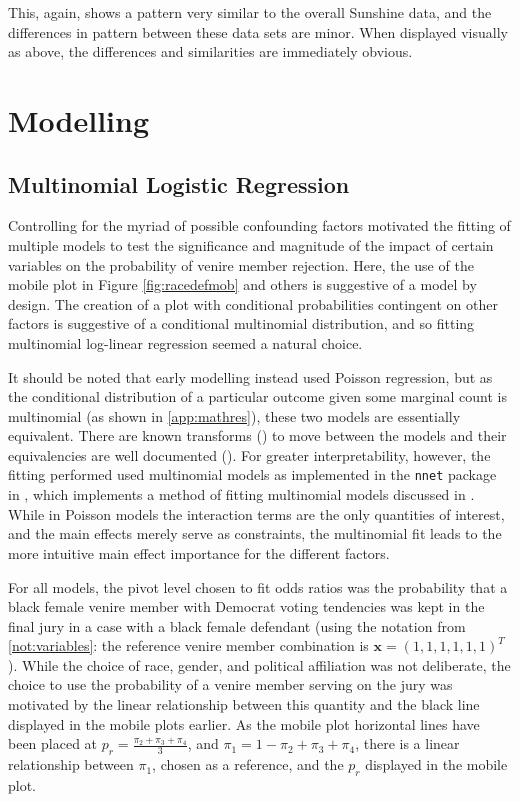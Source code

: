This, again, shows a pattern very similar to the overall Sunshine data, and the differences in pattern between these data sets are
minor. When displayed visually as above, the differences and similarities are immediately obvious.

\section{Modelling} \label{sec:mods}

\subsection{Multinomial Logistic Regression}

Controlling for the myriad of possible confounding factors motivated the fitting of multiple models to test the significance and
magnitude of the impact of certain variables on the probability of venire member rejection. Here, the use of the mobile plot in
Figure \ref{fig:racedefmob} and others is suggestive of a model by design. The creation of a plot with conditional probabilities
contingent on other factors is suggestive of a conditional multinomial distribution, and so fitting multinomial log-linear
regression seemed a natural choice.

It should be noted that early modelling instead used Poisson regression, but as the conditional distribution of a particular
outcome given some marginal count is multinomial (as shown in \ref{app:mathres}), these two models are essentially
equivalent. There are known transforms (\cite{baker1994}) to move between the models and their equivalencies are well documented
(\cite{lang1996}). For greater interpretability, however, the fitting performed used multinomial models as implemented in the
\texttt{nnet} package in \Rp, which implements a method of fitting multinomial models discussed in \cite{nnet}. While in Poisson
models the interaction terms are the only quantities of interest, and the main effects merely serve as constraints, the
multinomial fit leads to the more intuitive main effect importance for the different factors.

For all models, the pivot level chosen to fit odds ratios was the probability that a black female venire member with Democrat
voting tendencies was kept in the final jury in a case with a black female defendant (using the notation from \ref{not:variables}:
the reference venire member combination is $\mathbf{x} = (1,1,1,1,1,1)^T$). While the choice of race, gender, and political
affiliation was not deliberate, the choice to use the probability of a venire member serving on the jury was motivated by the
linear relationship between this quantity and the black line displayed in the mobile plots earlier. As the mobile plot horizontal
lines have been placed at $p_r = \frac{\pi_2 + \pi_3 + \pi_4}{3}$, and $\pi_1 = 1 - \pi_2 + \pi_3 + \pi_4$, there is a
linear relationship between $\pi_1$, chosen as a reference, and the $p_r$ displayed in the mobile plot.

